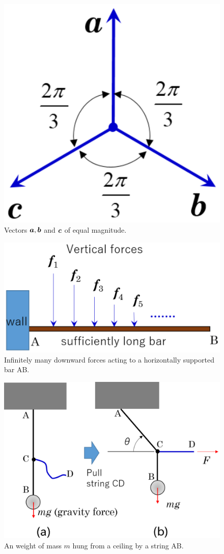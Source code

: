 \begin{figure}[h]
	\begin{center}
	\includegraphics[width=0.4\linewidth]{Prb1/fig1_2.eps} 
	\end{center}
	\caption{Vectors $\mbox{\boldmath $a$}, \mbox{\boldmath $b$}$ and $\mbox{\boldmath $c$}$ of equal magnitude.} 
	\label{fig:fig1_2}
\end{figure}
\begin{figure}[h]
	\begin{center}
	\includegraphics[width=0.6\linewidth]{Prb1/fig1_3.eps} 
	\end{center}
	\caption{Infinitely many downward forces acting to a horizontally supported bar AB.}
	\label{fig:fig1_3}
\end{figure}
\begin{figure}[h]
	\begin{center}
	\includegraphics[width=0.6\linewidth]{Prb1/fig1_4.eps} 
	\end{center}
	\caption{An weight of mass $m$ hung from a ceiling by a string AB.} 
	\label{fig:fig1_4}
\end{figure}
